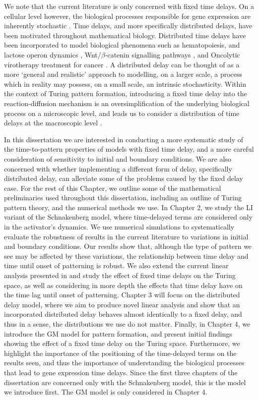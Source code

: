 We note that the current literature  is only concerned with fixed time delays. On a cellular level however, the biological processes responsible for gene expression are inherently stochastic \cite{raj,elowitz,mcadams,paulsson}. Time delays, and more specifically distributed delays, have been motivated throughout mathematical biology. Distributed time delays have been incorporated to model biological phenomena such as hematopoiesis, and lactose operon dynamics \cite{newdist}, Wnt/$\beta$-catenin signalling pathways \cite{signal}, and Oncolytic virotherapy treatment for cancer \cite{cancer}. A distributed delay can be thought of as a more `general and realistic' \cite{cancer} approach to modelling, on a larger scale, a process which in reality may possess, on a small scale, an intrinsic stochasticity. Within the context of Turing pattern formation, introducing a fixed time delay into the reaction-diffusion mechanism is an oversimplification of the underlying biological process on a microscopic level, and leads us to consider a distribution of time delays at the macroscopic level \cite{bratsun,krausenew}.

In this dissertation we are interested in conducting a more systematic study of the time-to-pattern properties of models with fixed time delay, and a more careful consideration of sensitivity to initial and boundary conditions. We are also concerned with whether implementing a different form of delay, specifically distributed delay, can alleviate some of the problems caused by the fixed delay case. For the rest of this Chapter, we outline some of the mathematical preliminaries used throughout this dissertation, including an outline of Turing pattern theory, and the numerical methods we use. In Chapter 2, we study the LI variant of the Schnakenberg model, where time-delayed terms are considered only in the activator's dynamics. We use numerical simulations to systematically evaluate the robustness of results in the current literature to variations in initial and boundary conditions. Our results show that, although the type of pattern we see may be affected by these variations, the relationship between time delay and time until onset of patterning is robust. We also extend the current linear analysis presented in  and study the effect of fixed time delays on the Turing space, as well as considering in more depth the effects that time delay have on the time lag until onset of patterning. Chapter 3 will focus on the distributed delay model, where we aim to produce novel linear analysis and show that an incorporated distributed delay behaves almost identically to a fixed delay, and thus in a sense, the distributions we use do not matter. Finally, in Chapter 4, we introduce the GM model for pattern formation, and present initial findings showing the effect of a fixed time delay on the Turing space. Furthermore, we highlight the importance of the positioning of the time-delayed terms on the results seen, and thus the importance of understanding the biological processes that lead to gene expression time delays. Since the first three chapters of the dissertation are concerned only with the Schnakenberg model, this is the model we introduce first. The GM model is only considered in Chapter 4.

